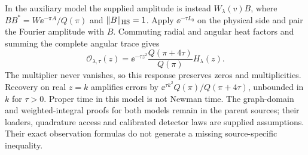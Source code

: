 In the auxiliary model the supplied amplitude is instead
\(W_\lambda(v)B\), where \(BB^*=W\ee^{-\pi A}/Q(\pi)\) and
\(\|B\|_{\rm HS}=1\). Apply \(\ee^{-\tau L_0}\) on the physical side
and pair the Fourier amplitude with \(B\). Commuting radial and angular
heat factors and summing the complete angular trace gives
\begin{equation}\label{eq:auxiliary-response}
 \mathcal O_{\lambda,\tau}(z)
 =\ee^{-\tau z^2}\frac{Q(\pi+4\tau)}{Q(\pi)}H_\lambda(z).
\end{equation}
The multiplier never vanishes, so this response preserves zeros and
multiplicities. Recovery on real \(z=k\) amplifies errors by
\(\ee^{\tau k^2}Q(\pi)/Q(\pi+4\tau)\), unbounded in \(k\) for
\(\tau>0\). Proper time in this model is not Newman time.
The graph-domain and weighted-integral proofs for both models remain
in the parent sources; their loaders, quadrature access and calibrated
detector laws are supplied assumptions. Their exact observation formulas
do not generate a missing source-specific inequality.
